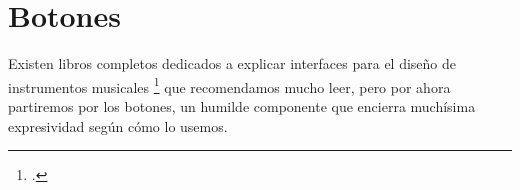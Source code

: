 \documentclass[../principal.tex]{subfiles}
\begin{document}
\chapter{Botones}

Existen libros completos dedicados a explicar interfaces para el diseño de instrumentos musicales \footcite{bjorn_push_2021} que recomendamos mucho leer, pero por ahora partiremos por los botones, un humilde componente que encierra muchísima expresividad según cómo lo usemos.

\newpage
\end{document}
